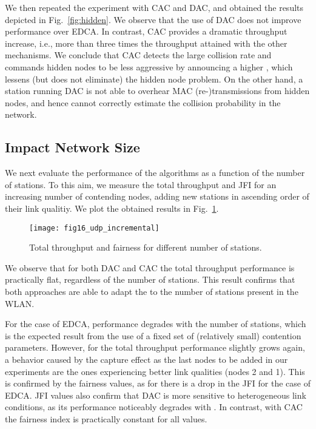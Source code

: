 \documentclass[a4paper,10pt]{article}
\begin{document}
We then repeated the experiment with CAC and DAC, and obtained the results depicted in Fig.~\ref{fig:hidden}. We observe that the use of DAC does not improve performance over EDCA. In contrast, CAC provides a dramatic throughput increase, i.e., more than three times the throughput attained with the other mechanisms. We conclude that CAC detects the large collision rate and commands hidden nodes to be less aggressive by announcing a higher , which lessens (but does not eliminate) the hidden node problem. On the other hand, a station running DAC is not able to overhear MAC (re-)transmissions from hidden nodes, and hence cannot correctly estimate the collision probability in the network.

\subsection{Impact Network Size}

We next evaluate the performance of the algorithms as a function of the number of stations. To this aim, we measure the total throughput and JFI for an increasing number of contending nodes, adding new stations in ascending order of their link qualitiy. We plot the obtained results in Fig.~\ref{fig:throughput_n}.

\begin{figure}\texttt{[image: fig16\_udp\_incremental]}\caption{Total throughput and fairness for different number of stations.}\label{fig:throughput_n}\end{figure}


We observe that for both DAC and CAC the total throughput performance is practically flat, regardless of the number of stations. This result confirms that both approaches are able to adapt the  to the number of stations present in the WLAN.

For the case of EDCA, performance degrades with the number of stations, which is the expected result from the use of a fixed set of (relatively small) contention parameters. However, for  the total throughput performance slightly grows again, a behavior caused by the capture effect as the last nodes to be added in our experiments are the ones experiencing better link qualities (nodes 2 and 1). This is confirmed by the fairness values, as for  there is a drop in the JFI for the case of EDCA. JFI values also confirm that DAC is more sensitive to heterogeneous link conditions, as its performance noticeably degrades with . In contrast, with CAC the fairness index is practically constant for all  values. 
\end{document}
